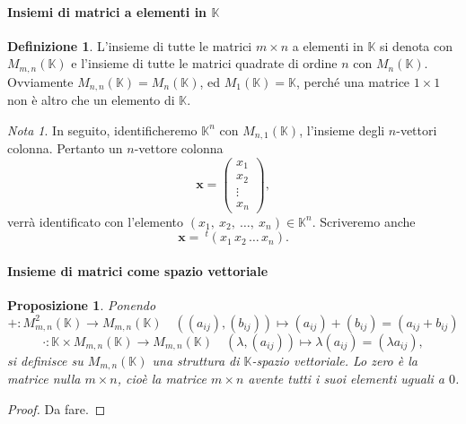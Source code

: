 \documentclass{article}
\theoremstyle{plain}
\newtheorem{prop}[thm]{Proposizione}
\theoremstyle{definition}
\newtheorem{defn}{Definizione}[section]
\theoremstyle{remark}
\newtheorem{note}{Nota}
\begin{document}
\vspace{10pt}

\paragraph{Insiemi di matrici a elementi in $\mathbb{K}$}
\begin{bxthm}
\begin{defn}
    L'insieme di tutte le matrici \( m \times n \) a elementi in \( \mathbb{K} \) si denota con \( M_{m,n}(\mathbb{K}) \) e l'insieme di tutte le matrici 
    quadrate di ordine \( n \) con \( M_n(\mathbb{K}) \). Ovviamente \( M_{n,n}(\mathbb{K}) = M_n(\mathbb{K}) \), ed \( M_{1}(\mathbb{K}) = \mathbb{K} \), 
    perché una matrice \( 1 \times 1 \) non è altro che un elemento di \( \mathbb{K} \).
\end{defn}
\end{bxthm}

\vspace{10pt}

\begin{note}
    In seguito, identificheremo \( \mathbb{K}^n \) con \( M_{n,1}(\mathbb{K}) \), l'insieme degli \( n \)-vettori colonna. Pertanto un \( n \)-vettore colonna
    \[\mathbf{x}=
    \begin{pmatrix}
    x_1 \\
    x_2 \\
    \vdots \\
    x_n
    \end{pmatrix},
    \]
    verrà identificato con l'elemento \( (x_1, \ x_2, \ \ldots, \ x_n)\in \mathbb{K}^n \). 
    Scriveremo anche \[ \mathbf{x} =\ ^{t}(x_1\, x_2\, \ldots\, x_n).\]    
\end{note}


\vspace{10pt}

\paragraph{Insieme di matrici come spazio vettoriale}
\begin{bxthm}
\begin{prop}
    Ponendo
    \[ +:M_{m,n}^2(\mathbb{K})\to M_{m,n}(\mathbb{K})\quad((a_{ij}), (b_{ij}))\mapsto (a_{ij}) + (b_{ij}) = (a_{ij} + b_{ij}) \]
    \[ \cdot:\mathbb{K}\times M_{m,n}(\mathbb{K})\to M_{m,n}(\mathbb{K})\quad (\lambda ,(a_{ij}))\mapsto \lambda (a_{ij}) = (\lambda a_{ij}), \]
    si definisce su \( M_{m,n}(\mathbb{K}) \) una struttura di \( \mathbb{K} \)-spazio vettoriale.
    Lo zero è la matrice nulla \( m \times n \), cioè la matrice \( m \times n \) avente tutti i suoi elementi uguali a $0$.
\end{prop}
\end{bxthm}
\begin{proof}
    Da fare.
\end{proof}
\end{document}
